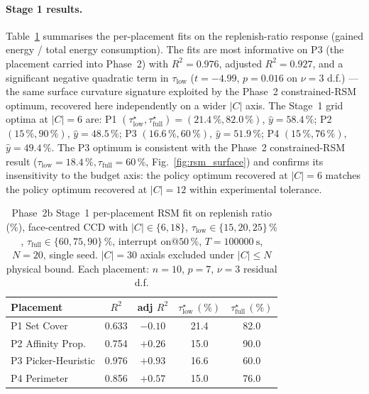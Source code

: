 \documentclass[conference]{IEEEtran}
\begin{document}
\paragraph{Stage 1 results.}
Table~\ref{tab:phase2b_stage1} summarises the per-placement fits on the replenish-ratio response (gained energy / total energy consumption). The fits are most informative on P3 (the placement carried into Phase~2) with $R^2 = 0.976$, adjusted $R^2 = 0.927$, and a significant negative quadratic term in $\tau_\text{low}$ ($t = -4.99$, $p = 0.016$ on $\nu = 3$ d.f.) --- the same surface curvature signature exploited by the Phase~2 constrained-RSM optimum, recovered here independently on a wider $|C|$ axis. The Stage~1 grid optima at $|C| = 6$ are: P1 $(\tau_\text{low}^\star, \tau_\text{full}^\star) = (21.4\,\%, 82.0\,\%)$, $\hat{y} = 58.4\,\%$; P2 $(15\,\%, 90\,\%)$, $\hat{y} = 48.5\,\%$; P3 $(16.6\,\%, 60\,\%)$, $\hat{y} = 51.9\,\%$; P4 $(15\,\%, 76\,\%)$, $\hat{y} = 49.4\,\%$. The P3 optimum is consistent with the Phase~2 constrained-RSM result ($\tau_\text{low} = 18.4\,\%, \tau_\text{full} = 60\,\%$, Fig.~\ref{fig:rsm_surface}) and confirms its insensitivity to the budget axis: the policy optimum recovered at $|C| = 6$ matches the policy optimum recovered at $|C| = 12$ within experimental tolerance.

\begin{table}[t]
  \centering
  \caption{Phase~2b Stage~1 per-placement RSM fit on replenish ratio (\%), face-centred CCD with $|C| \in \{6, 18\}$, $\tau_\text{low} \in \{15,20,25\}\,\%$, $\tau_\text{full} \in \{60,75,90\}\,\%$, interrupt on@$50\,\%$, $T = \SI{100000}{\second}$, $N = 20$, single seed. $|C| = 30$ axials excluded under $|C| \le N$ physical bound. Each placement: $n = 10$, $p = 7$, $\nu = 3$ residual d.f.}
  \label{tab:phase2b_stage1}
  \footnotesize
  \setlength{\tabcolsep}{4pt}
  \begin{tabular}{lcccc}
    \toprule
    Placement & $R^2$ & adj $R^2$ & $\tau_\text{low}^\star\,(\%)$ & $\tau_\text{full}^\star\,(\%)$ \\
    \midrule
    P1 Set Cover         & 0.633 & $-0.10$ & 21.4 & 82.0 \\
    P2 Affinity Prop.    & 0.754 & $+0.26$ & 15.0 & 90.0 \\
    P3 Picker-Heuristic  & 0.976 & $+0.93$ & 16.6 & 60.0 \\
    P4 Perimeter         & 0.856 & $+0.57$ & 15.0 & 76.0 \\
    \bottomrule
  \end{tabular}
\end{table}
\end{document}
